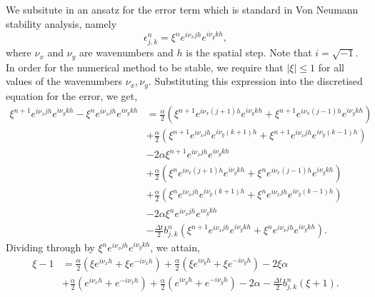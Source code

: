 We subsitute in an ansatz for the error term which is standard in Von Neumann stability analysis, namely
\begin{equation*}
    \epsilon_{j,k}^n = \xi^n e^{i \nu_x j h} e^{i \nu_y k h},
\end{equation*}
where $\nu_x$ and $\nu_y$ are wavenumbers and $h$ is the spatial step. Note that $i = \sqrt{-1}$. In order for the numerical
method to be stable, we require that $|\xi| \leq 1$ for all values of the wavenumbers $\nu_x, \nu_y$.
Substituting this expression into the discretised equation for the error, we get,
\begin{equation*}
    \begin{split}
        \xi^{n+1} e^{i \nu_x j h} e^{i \nu_y k h} - \xi^{n} e^{i \nu_x j h} e^{i \nu_y k h} &=
       \frac{\alpha}{2}  \left( \xi^{n+1} e^{i \nu_x (j+1) h} e^{i \nu_y k h} + \xi^{n+1} e^{i \nu_x (j-1) h} e^{i \nu_y k h} \right) \\
       &+ \frac{\alpha}{2}\left( \xi^{n+1} e^{i \nu_x j h} e^{i \nu_y (k+1) h} + \xi^{n+1} e^{i \nu_x j h} e^{i \nu_y (k-1) h}  \right) \\
       &-2 \alpha\xi^{n+1} e^{i \nu_x j h} e^{i \nu_y k h}  \\
       &+\frac{\alpha}{2} \left( \xi^{n} e^{i \nu_x (j+1) h} e^{i \nu_y k h}+ \xi^{n} e^{i \nu_x (j-1) h} e^{i \nu_y k h}\right) \\
       &+ \frac{\alpha}{2}\left(\xi^{n} e^{i \nu_x j h} e^{i \nu_y (k+1) h} + \xi^{n} e^{i \nu_x j h} e^{i \nu_y (k-1) h}  \right) \\
       &-2 \alpha \xi^{n} e^{i \nu_x j h} e^{i \nu_y k h}\\
       &-\frac{\Delta t}{2} b_{j,k}^{n} (\xi^{n+1} e^{i \nu_x j h} e^{i \nu_y k h} + \xi^{n} e^{i \nu_x j h} e^{i \nu_y k h}).
    \end{split}
\end{equation*}
Dividing through by $\xi^{n} e^{i \nu_x j h} e^{i \nu_y k h}$, we attain,
\begin{equation*}
    \begin{split}
        \xi - 1 &=
       \frac{\alpha}{2}  \left( \xi e^{i \nu_x h}+ \xi e^{-i \nu_x h} \right) 
       + \frac{\alpha}{2}\left( \xi  e^{i \nu_y h} + \xi  e^{-i \nu_y h}  \right) 
       -2 \xi \alpha  \\
       &+\frac{\alpha}{2} \left(  e^{i \nu_x  h}+  e^{-i \nu_x h}\right)
       + \frac{\alpha}{2}\left(   e^{i \nu_y h} +   e^{-i \nu_y  h}  \right) 
       -2 \alpha
       -\frac{\Delta t}{2} b_{j,k}^{n} (\xi + 1).
    \end{split}
\end{equation*}
